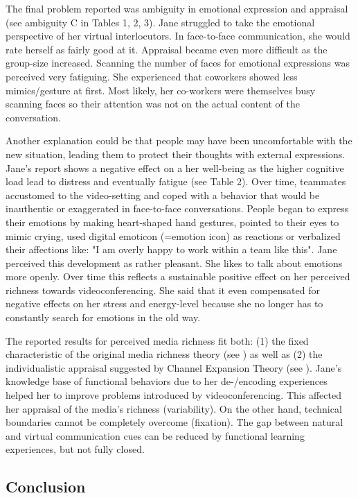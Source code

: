 \documentclass[man]{apa7}
\begin{document}
The final problem reported was ambiguity in emotional expression and appraisal (see ambiguity C in Tables 1, 2, 3). Jane struggled to take the emotional perspective of her virtual interlocutors. In face-to-face communication, she would rate herself as fairly good at it. Appraisal became even more difficult as the group-size increased. Scanning the number of faces for emotional expressions was perceived very fatiguing. She experienced that coworkers showed less mimics/gesture at first. Most likely, her co-workers were themselves busy scanning faces so their attention was not on the actual content of the conversation.

Another explanation could be that people may have been uncomfortable with the new situation, leading them to protect their thoughts with external expressions. Jane's report shows a negative effect on a her well-being as the higher cognitive load lead to distress and eventually fatigue (see Table 2). Over time, teammates accustomed to the video-setting and coped with a behavior that would be inauthentic or exaggerated in face-to-face conversations. People began to express their emotions by making heart-shaped hand gestures, pointed to their eyes to mimic crying, used digital emoticon (=emotion icon) as reactions or verbalized their affections like: "I am overly happy to work within a team like this". Jane perceived this development as rather pleasant. She likes to talk about emotions more openly. Over time this reflects a sustainable positive effect on her perceived richness towards videoconferencing. She said that it even compensated for negative effects on her stress and energy-level because she no longer has to constantly search for emotions in the old way.

The reported results for perceived media richness fit both: (1) the fixed characteristic of the original media richness theory (see \cite{daft1983information}) as well as (2) the individualistic appraisal suggested by Channel Expansion Theory (see \cite{Carlson1999}). Jane's knowledge base of functional behaviors due to her de-/encoding experiences helped her to improve problems introduced by videoconferencing. This affected her appraisal of the media's richness (variability). On the other hand, technical boundaries cannot be completely overcome (fixation). The gap between natural and virtual communication cues can be reduced by functional learning experiences, but not fully closed.

\subsection{Conclusion}
\end{document}
